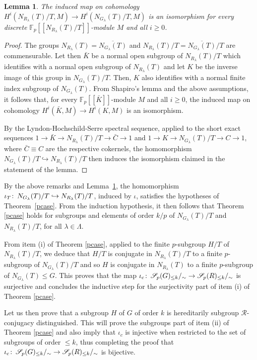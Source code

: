 \documentclass[12pt,twoside]{amsart}
\newcommand\F{{\mathbb F}}
\newcommand\cR{{\mathcal R}}
\newcommand\hookra{\hookrightarrow}
\newcommand\ol{\overline}
\newcommand\cS{{\mathscr S}}
\newcommand\ld{\lambda}
\newcommand\Ld{\Lambda}
\def\co{\colon\thinspace}
\newtheorem{lemma}[theorem]{Lemma}
\theoremstyle{definition}
\begin{document}
\begin{lemma}\label{inductionok}The induced map on cohomology $H^i(N_{R_\ld}(T)/T,M)\to H^i(N_{G_\ld}(T)/T,M)$ 
is an isomorphism for every discrete $\F_p[[N_{R_\ld}(T)/T]]$-module $M$ and all $i\geq 0$.
\end{lemma}

\begin{proof}The groups $N_{R_\ld}(T)=\ol{N_{G_\ld}(T)}$ and $N_{R_\ld}(T)/T=\ol{N_{G_\ld}(T)}/T$ are commensurable. Let then
$\bar K$ be a normal open subgroup of $N_{R_\ld}(T)/T$ which identifies with a normal open subgroup of $N_{R_\ld}(T)$ and let
$K$ be the inverse image of this group in $N_{G_\ld}(T)/T$. Then, $K$ also identifies with a normal finite index subgroup of $N_{G_\ld}(T)$.
From Shapiro's lemma and the above assumptions, it follows that, for every $\F_p[[\bar K]]$-module $M$ and all $i\geq 0$,
the induced map on cohomology $H^i(\bar K,M)\to H^i(K,M)$ is an isomorphism. 

By the Lyndon-Hochschild-Serre spectral sequence,
applied to the short exact sequences $1\to\bar K\to N_{R_\ld}(T)/T\to\bar C\to 1$ and $1\to K\to N_{G_\ld}(T)/T\to C\to 1$, 
where $\bar C\equiv C$ are the respective cokernels, the homomorphism $N_{G_\ld}(T)/T\hookra N_{R_\ld}(T)/T$ 
then induces the isomorphism claimed in the statement of the lemma.
\end{proof}

By the above remarks and Lemma~\ref{inductionok}, the homomorphism $\iota_T\co N_{G_\ld}(T)/T\hookra N_{R_\ld}(T)/T$, induced by $\iota$,
satisfies the hypotheses of Theorem~\ref{pcase}. From the induction hypothesis, it then follows that Theorem \ref{pcase} holds
for subgroups and elements of order $k/p$ of $N_{G_\ld}(T)/T$ and $N_{R_\ld}(T)/T$, for all $\ld\in\Ld$.

From item (i) of Theorem \ref{pcase}, applied to the finite $p$-subgroup $H/T$ of $N_{R_\ld}(T)/T$, 
we deduce that $H/T$ is conjugate in $N_{R_\ld}(T)/T$ to a finite $p$-subgroup of 
$N_{G_\ld}(T)/T$ and so  $H$ is conjugate in $N_{R_\ld}(T)$ to a finite $p$-subgroup of $N_{G_\ld}(T)\leq G$. This proves that the map
$\iota_c\co\cS_p(G)_{\leq k}/_\sim\to\cS_p(R)_{\leq k}/_\sim$ is surjective and concludes the inductive step
for the surjectivity part of item (i) of Theorem \ref{pcase}. 

Let us then prove that a subgroup $H$ of $G$ of order $k$ is hereditarily subgroup $\cR$-conjugacy distinguished. This will prove the subgroups 
part of item (ii) of Theorem \ref{pcase} and also imply that $\iota_c$ is injective when restricted to the set of subgroups of order $\leq k$,
thus completing the proof that $\iota_c\co\cS_p(G)_{\leq k}/_\sim\to\cS_p(R)_{\leq k}/_\sim$ is bijective. 
\end{document}
